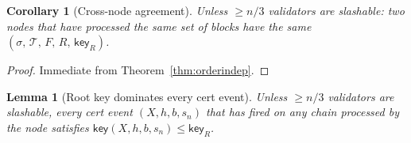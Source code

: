 \documentclass{article}
\newcommand{\T}[0]{\ensuremath{\mathcal{T}}}
\newcommand{\key}{\mathsf{key}}
\theoremstyle{plain}
\newtheorem{corollary}{Corollary}
\newtheorem{lemma}{Lemma}
\theoremstyle{definition}
\theoremstyle{remark}
\begin{document}
\begin{corollary}[Cross-node agreement]\label{cor:agreement}
Unless $\geq n/3$ validators are slashable: two nodes that have processed the same set of blocks have the same $(\sigma,\, \T,\, F,\, R,\, \key_R)$.
\end{corollary}

\begin{proof}
Immediate from Theorem~\ref{thm:orderindep}.
\end{proof}

\begin{lemma}[Root key dominates every cert event]\label{rev:lem:Rs-key-dominates}
Unless $\geq n/3$ validators are slashable, every cert event $(X, h, b, s_n)$ that has fired on any chain processed by the node satisfies $\key(X, h, b, s_n) \leq \key_R$.
\end{lemma}
\end{document}

